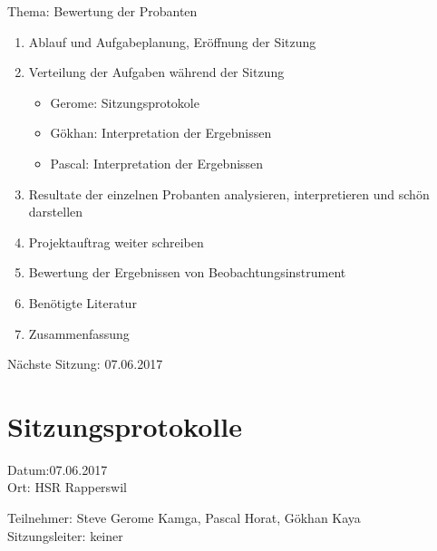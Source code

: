 Thema: Bewertung der Probanten
\begin{enumerate}

\item Ablauf und Aufgabeplanung, Eröffnung der Sitzung 

\item  Verteilung der Aufgaben während der Sitzung
\begin{itemize}
\item Gerome: Sitzungsprotokole
\item Gökhan: Interpretation der Ergebnissen
\item Pascal: Interpretation der Ergebnissen
\end{itemize}

\item Resultate der einzelnen Probanten analysieren, interpretieren und schön darstellen 		

\item 	Projektauftrag weiter schreiben

\item 	Bewertung der Ergebnissen von Beobachtungsinstrument


\item Benötigte Literatur

\item Zusammenfassung

\end{enumerate}

Nächste Sitzung: 07.06.2017

\newpage
\section*{Sitzungsprotokolle}

Datum:07.06.2017\\
Ort: HSR Rapperswil

Teilnehmer: Steve Gerome Kamga, Pascal Horat, Gökhan Kaya\\
Sitzungsleiter: keiner

